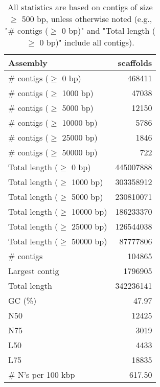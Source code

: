 \documentclass[12pt,a4paper]{article}
\begin{document}
\begin{table}[ht]
\begin{center}
\caption{All statistics are based on contigs of size $\geq$ 500 bp, unless otherwise noted (e.g., "\# contigs ($\geq$ 0 bp)" and "Total length ($\geq$ 0 bp)" include all contigs).}
\begin{tabular}{|l*{1}{|r}|}
\hline
Assembly & scaffolds \\ \hline
\# contigs ($\geq$ 0 bp) & 468411 \\ \hline
\# contigs ($\geq$ 1000 bp) & 47038 \\ \hline
\# contigs ($\geq$ 5000 bp) & 12150 \\ \hline
\# contigs ($\geq$ 10000 bp) & 5786 \\ \hline
\# contigs ($\geq$ 25000 bp) & 1846 \\ \hline
\# contigs ($\geq$ 50000 bp) & 722 \\ \hline
Total length ($\geq$ 0 bp) & 445007888 \\ \hline
Total length ($\geq$ 1000 bp) & 303358912 \\ \hline
Total length ($\geq$ 5000 bp) & 230810071 \\ \hline
Total length ($\geq$ 10000 bp) & 186233370 \\ \hline
Total length ($\geq$ 25000 bp) & 126544038 \\ \hline
Total length ($\geq$ 50000 bp) & 87777806 \\ \hline
\# contigs & 104865 \\ \hline
Largest contig & 1796905 \\ \hline
Total length & 342236141 \\ \hline
GC (\%) & 47.97 \\ \hline
N50 & 12425 \\ \hline
N75 & 3019 \\ \hline
L50 & 4433 \\ \hline
L75 & 18835 \\ \hline
\# N's per 100 kbp & 617.50 \\ \hline
\end{tabular}
\end{center}
\end{table}
\end{document}
